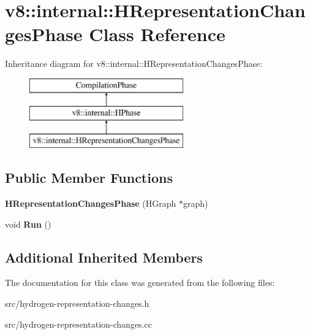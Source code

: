 \hypertarget{classv8_1_1internal_1_1_h_representation_changes_phase}{}\section{v8\+:\+:internal\+:\+:H\+Representation\+Changes\+Phase Class Reference}
\label{classv8_1_1internal_1_1_h_representation_changes_phase}
Inheritance diagram for v8\+:\+:internal\+:\+:H\+Representation\+Changes\+Phase\+:\begin{figure}[H]
\begin{center}
\leavevmode
\includegraphics[height=3.000000cm]{classv8_1_1internal_1_1_h_representation_changes_phase}
\end{center}
\end{figure}
\subsection*{Public Member Functions}
\begin{DoxyCompactItemize}
\item 
\hypertarget{classv8_1_1internal_1_1_h_representation_changes_phase_a1398be8a4e72282dabf2ebbe93a48f5b}{}{\bfseries H\+Representation\+Changes\+Phase} (H\+Graph $\ast$graph)\label{classv8_1_1internal_1_1_h_representation_changes_phase_a1398be8a4e72282dabf2ebbe93a48f5b}

\item 
\hypertarget{classv8_1_1internal_1_1_h_representation_changes_phase_a097d0c06bf0396fb0bfaeb93d7386089}{}void {\bfseries Run} ()\label{classv8_1_1internal_1_1_h_representation_changes_phase_a097d0c06bf0396fb0bfaeb93d7386089}

\end{DoxyCompactItemize}
\subsection*{Additional Inherited Members}


The documentation for this class was generated from the following files\+:\begin{DoxyCompactItemize}
\item 
src/hydrogen-\/representation-\/changes.\+h\item 
src/hydrogen-\/representation-\/changes.\+cc\end{DoxyCompactItemize}
